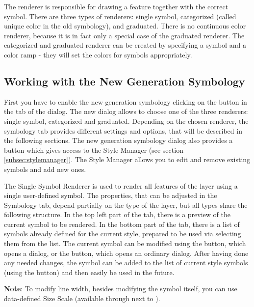 The renderer is responsible for drawing a feature together with the correct
symbol. There are three types of renderers: single symbol, categorized (called
unique color in the old symbology), and graduated. There is no continuous color
renderer, because it is in fact only a special case of the graduated renderer.
The categorized and graduated renderer can be created by specifying a symbol
and a color ramp - they will set the colors for symbols appropriately.

\subsection{Working with the New Generation Symbology}\label{new_generation_sym}

First you have to enable the new generation symbology clicking on the
 button in the  tab of the
 dialog. The new dialog allows to choose one of the
three renderers: single symbol, categorized and graduated. Depending on the
chosen renderer, the symbology tab provides different settings and options, that
will be described in the following sections. The new generation symbology dialog 
also provides a  button which gives access to the Style 
Manager (see section \ref{subsec:stylemanager}). The Style Manager allows you to 
edit and remove existing symbols and add new ones. 


The Single Symbol Renderer is used to render all features of the layer using a
single user-defined symbol. The properties, that can be adjusted in the
Symbology tab, depend partially on the type of the layer, but all types share
the following structure. In the top left part of the tab, there is a preview of
the current symbol to be rendered. In the bottom part of the tab, there is a
list of symbols already defined for the current style, prepared to be used via
selecting them from the list. The current symbol can be modified using the
 button, which opens a  dialog, or
the  button, which opens an ordinary  dialog.
After having done any needed changes, the symbol can be added to the list of
current style symbols (using the  button) and then easily
be used in the future.

\textbf{Note}: To modify line width, besides modifying the symbol itself, you
can use data-defined Size Scale (available through  next to 
).

